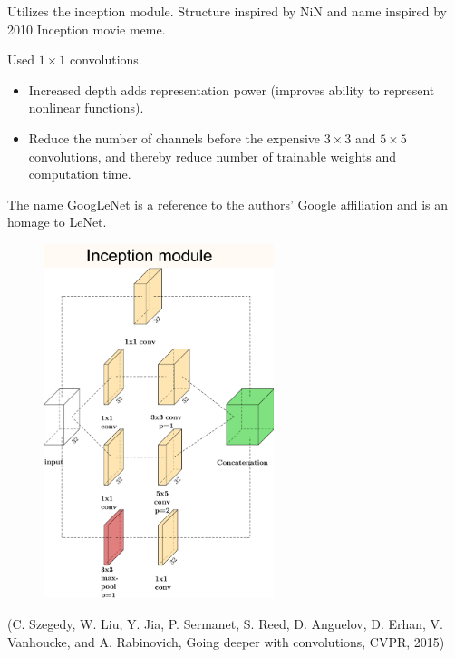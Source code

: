 \begin{definition}
    Utilizes the inception module. Structure inspired by NiN and name inspired by 2010 Inception movie meme.

    Used $1 \times 1$ convolutions.

    \begin{itemize}
        \item Increased depth adds representation power (improves ability to represent nonlinear functions).
        \item Reduce the number of channels before the expensive $3 \times 3$ and $5 \times 5$ convolutions, and thereby reduce number of trainable weights and computation time.
    \end{itemize}

    The name GoogLeNet is a reference to the authors' Google affiliation and is an homage to LeNet.

    \begin{figure}[H]
        \centering
        \includegraphics[width=0.6\textwidth]{.././assets/7.12.png}
    \end{figure}

    (C. Szegedy, W. Liu, Y. Jia, P. Sermanet, S. Reed, D. Anguelov, D. Erhan, V. Vanhoucke, and A. Rabinovich, Going deeper with convolutions, CVPR, 2015)

    \par\noindent\textcolor{gray}{\hdashrule{\textwidth}{0.4pt}{1pt 2pt}}


\end{definition}
